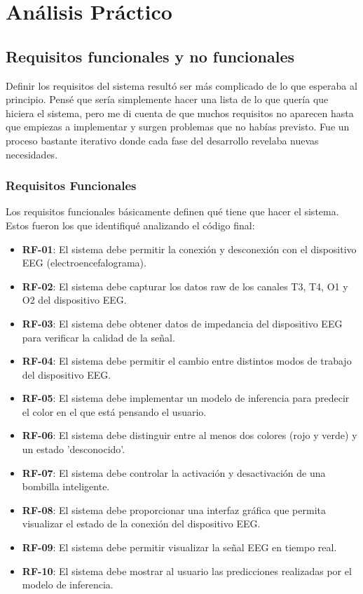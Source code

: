 \chapter{Análisis Práctico}\label{ch:practical_analytics}

\section{Requisitos funcionales y no funcionales}

Definir los requisitos del sistema resultó ser más complicado de lo que esperaba al principio. Pensé que sería simplemente hacer una lista de lo que quería que hiciera el sistema, pero me di cuenta de que muchos requisitos no aparecen hasta que empiezas a implementar y surgen problemas que no habías previsto. Fue un proceso bastante iterativo donde cada fase del desarrollo revelaba nuevas necesidades.

\subsection{Requisitos Funcionales}

Los requisitos funcionales básicamente definen qué tiene que hacer el sistema. Estos fueron los que identifiqué analizando el código final:

\begin{itemize}
    \item \textbf{RF-01}: El sistema debe permitir la conexión y desconexión con el dispositivo EEG (electroencefalograma).
    \item \textbf{RF-02}: El sistema debe capturar los datos raw de los canales T3, T4, O1 y O2 del dispositivo EEG.
    \item \textbf{RF-03}: El sistema debe obtener datos de impedancia del dispositivo EEG para verificar la calidad de la señal.
    \item \textbf{RF-04}: El sistema debe permitir el cambio entre distintos modos de trabajo del dispositivo EEG.
    \item \textbf{RF-05}: El sistema debe implementar un modelo de inferencia para predecir el color en el que está pensando el usuario.
    \item \textbf{RF-06}: El sistema debe distinguir entre al menos dos colores (rojo y verde) y un estado 'desconocido'.
    \item \textbf{RF-07}: El sistema debe controlar la activación y desactivación de una bombilla inteligente.
    \item \textbf{RF-08}: El sistema debe proporcionar una interfaz gráfica que permita visualizar el estado de la conexión del dispositivo EEG.
    \item \textbf{RF-09}: El sistema debe permitir visualizar la señal EEG en tiempo real.
    \item \textbf{RF-10}: El sistema debe mostrar al usuario las predicciones realizadas por el modelo de inferencia.
\end{itemize}

